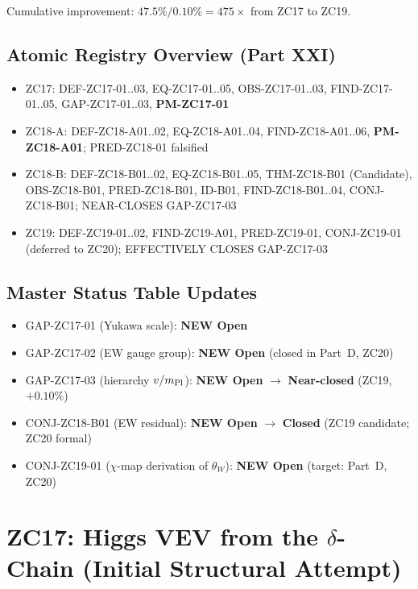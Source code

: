\documentclass[12pt, a4paper]{article}
\begin{document}
Cumulative improvement: $47.5\%/0.10\% = 475\times$ from ZC17 to ZC19.

\subsection*{Atomic Registry Overview (Part XXI)}

\begin{itemize}[leftmargin=*, noitemsep]
\item ZC17: DEF-ZC17-01..03, EQ-ZC17-01..05, OBS-ZC17-01..03,
  FIND-ZC17-01..05, GAP-ZC17-01..03, \textbf{PM-ZC17-01}
\item ZC18-A: DEF-ZC18-A01..02, EQ-ZC18-A01..04, FIND-ZC18-A01..06,
  \textbf{PM-ZC18-A01}; PRED-ZC18-01 falsified
\item ZC18-B: DEF-ZC18-B01..02, EQ-ZC18-B01..05, THM-ZC18-B01
  (Candidate), OBS-ZC18-B01, PRED-ZC18-B01, ID-B01, FIND-ZC18-B01..04,
  CONJ-ZC18-B01; NEAR-CLOSES GAP-ZC17-03
\item ZC19: DEF-ZC19-01..02, FIND-ZC19-A01, PRED-ZC19-01,
  CONJ-ZC19-01 (deferred to ZC20); EFFECTIVELY CLOSES GAP-ZC17-03
\end{itemize}

\subsection*{Master Status Table Updates}

\begin{itemize}[leftmargin=*, noitemsep]
\item GAP-ZC17-01 (Yukawa scale): \textbf{NEW Open}
\item GAP-ZC17-02 (EW gauge group): \textbf{NEW Open} (closed in Part~D, ZC20)
\item GAP-ZC17-03 (hierarchy $v/m_{\rm Pl}$): \textbf{NEW Open} $\to$
  \textbf{Near-closed} (ZC19, $+0.10\%$)
\item CONJ-ZC18-B01 (EW residual): \textbf{NEW Open} $\to$
  \textbf{Closed} (ZC19 candidate; ZC20 formal)
\item CONJ-ZC19-01 ($\chi$-map derivation of $\theta_W$):
  \textbf{NEW Open} (target: Part~D, ZC20)
\end{itemize}

\section{ZC17: Higgs VEV from the $\delta$-Chain (Initial Structural Attempt)}
\label{sec:zc17-higgs}
\end{document}
